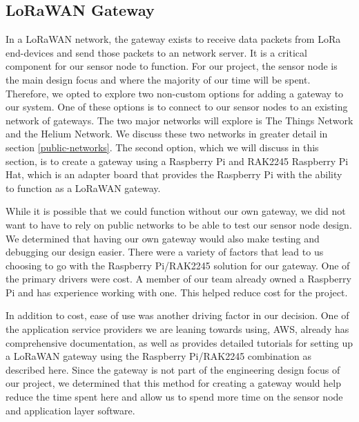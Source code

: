 \subsection{LoRaWAN Gateway}
In a LoRaWAN network, the gateway exists to receive data packets from LoRa end-devices and send those packets to an network server. It is a critical component for our sensor node to function. For our project, the sensor node is the main design focus and where the majority of our time will be spent. Therefore, we opted to explore two non-custom options for adding a gateway to our system. One of these options is to connect to our sensor nodes to an existing network of gateways. The two major networks will explore is The Things Network and the Helium Network. We discuss these two networks in greater detail in section \ref{public-networks}. The second option, which we will discuss in this section, is to create a gateway using a Raspberry Pi and RAK2245 Raspberry Pi Hat, which is an adapter board that provides the Raspberry Pi with the ability to function as a LoRaWAN gateway.

While it is possible that we could function without our own gateway, we did not want to have to rely on public networks to be able to test our sensor node design. We determined that having our own gateway would also make testing and debugging our design easier. There were a variety of factors that lead to us choosing to go with the Raspberry Pi/RAK2245 solution for our gateway. One of the primary drivers were cost. A member of our team already owned a Raspberry Pi and has experience working with one. This helped reduce cost for the project.

In addition to cost, ease of use was another driving factor in our decision. One of the application service providers we are leaning towards using, AWS, already has comprehensive documentation, as well as provides detailed tutorials for setting up a LoRaWAN gateway using the Raspberry Pi/RAK2245 combination as described here. Since the gateway is not part of the engineering design focus of our project, we determined that this method for creating a gateway would help reduce the time spent here and allow us to spend more time on the sensor node and application layer software.